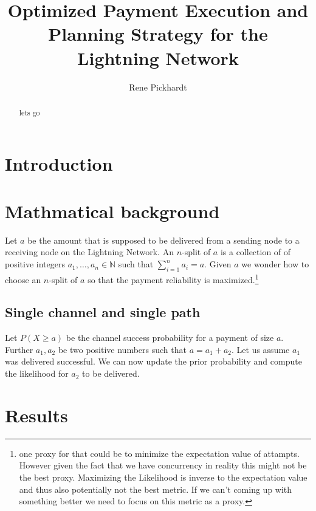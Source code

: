 \documentclass[10pt,twocolumn]{article}
\title{Optimized Payment Execution and Planning Strategy for the Lightning Network}
\begin{document}
 

\author{Rene Pickhardt}

\maketitle

 
\begin{abstract}
lets go
\end{abstract}

\section{Introduction}

\section{Mathmatical background}
Let $a$ be the amount that is supposed to be delivered from a sending node to a receiving node on the Lightning Network.
An $n$-split of $a$ is a collection of of positive integers $a_1,\dots,a_n \in \mathbb{N}$ such that $\sum_{i=1}^na_i=a$.
Given $a$ we wonder how to choose an $n$-split of $a$ so that the payment reliability is maximized.\footnote{one proxy for that could be to minimize the expectation value of attampts. However given the fact that we have concurrency in reality this might not be the best proxy. Maximizing the Likelihood is inverse to the expectation value and thus also potentially not the best metric. If we can't coming up with something better we need to focus on this metric as a proxy.}

\subsection{Single channel and single path}
Let $P(X \geq a)$ be the channel success probability for a payment of size $a$.
Further $a_1,a_2$ be two positive numbers such that $a=a_1+a_2$. 
Let us assume $a_1$ was delivered successful.
We can now update the prior probability and compute the likelihood for $a_2$ to be delivered.



\section{Results}
\end{document}
